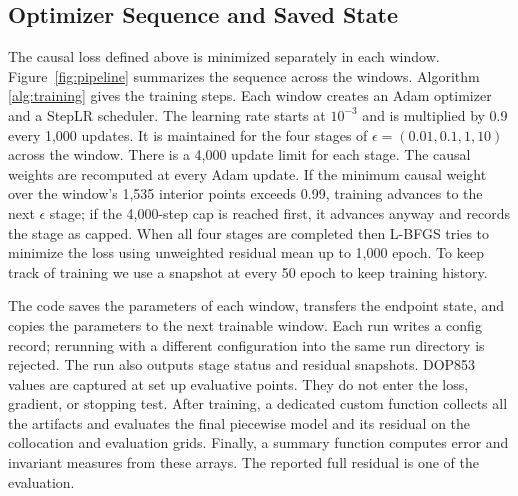 \documentclass[conference]{IEEEtran}
\begin{document}
\subsection{Optimizer Sequence and Saved State}

The causal loss defined above is minimized separately in each window. Figure~\ref{fig:pipeline}
summarizes the sequence across the windows. Algorithm \ref{alg:training} gives the training steps. Each window creates an Adam optimizer and a StepLR scheduler. The learning rate starts at $10^{-3}$ and is multiplied by 0.9 every 1,000 updates. It is maintained for the four stages of $\epsilon=(0.01,0.1,1,10)$ across the window. There is a 4,000 update limit for each stage. The causal weights are recomputed at every Adam update. If the minimum causal weight over the window's 1,535 interior points exceeds 0.99, training advances to the next $\epsilon$ stage; if the 4,000-step cap is reached first, it advances anyway and records the stage as capped. When all four stages are completed then L-BFGS tries to minimize the loss using unweighted residual mean up to 1,000 epoch. To keep track of training we use a snapshot at every 50 epoch to keep training history.

The code saves the parameters of each window, transfers the endpoint state, and copies the parameters to the next trainable window. Each run writes a config record; rerunning with a different configuration into the same run directory is rejected. The run also outputs stage status and residual snapshots. DOP853 values are captured at set up evaluative points. They do not enter the loss, gradient, or stopping test. After training, a dedicated custom function collects all the artifacts and evaluates the final piecewise model and its residual on the collocation and evaluation grids. Finally, a summary function computes error and invariant measures from these arrays. The reported full residual is one of the evaluation.
\end{document}
